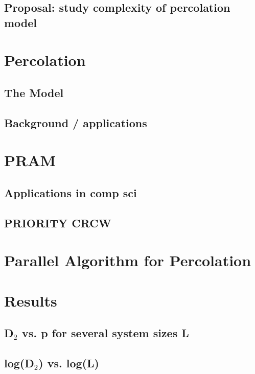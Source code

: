\documentclass{umthesis}          %
\begin{document}
\subsection{Proposal: study complexity of percolation model}
\label{sec-5.1.2}

\section{Percolation}
\label{sec-5.2}

\subsection{The Model}
\label{sec-5.2.1}

\subsection{Background / applications}
\label{sec-5.2.2}

\section{PRAM}
\label{sec-5.3}

\subsection{Applications in comp sci}
\label{sec-5.3.1}

\subsection{PRIORITY CRCW}
\label{sec-5.3.2}

\section{Parallel Algorithm for Percolation}
\label{sec-5.4}

\section{Results}
\label{sec-5.5}

\subsection{D$_2$ vs. p for several system sizes L}
\label{sec-5.5.1}

\subsection{log(D$_2$) vs. log(L)}
\label{sec-5.5.2}
\end{document}
